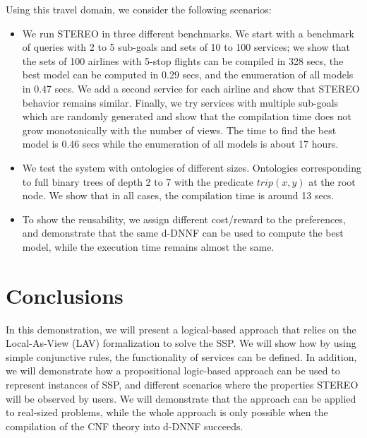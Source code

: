\documentclass{llncs}
\newcommand{\trip}{\textit{trip}}
\begin{document}
Using this travel domain, we  consider the following scenarios:
\begin{itemize}
\item We run STEREO in three different benchmarks.   We start with a benchmark of  queries with 2
to 5 sub-goals and sets of 10 to 100 services; we show that the sets of 100
airlines with 5-stop flights can be compiled in 328 secs, 
the best model can be computed in 0.29 secs, and the enumeration of all models in 0.47 secs. We add a second  service for each airline and show that STEREO behavior remains similar. Finally, we  try services with multiple sub-goals which are randomly generated and show that the compilation time  does not grow monotonically with the number of views.  The time to find the best model 
is 0.46 secs while the enumeration of all models is about 17 hours.
\item We test the system with ontologies of different sizes. Ontologies corresponding to full binary trees of depth 2 to 7  with the predicate $\trip(x,y)$ at the root node. We show that in all cases, the compilation time  is  around 13 secs.
\item To show the reusability, we assign different cost/reward to the  preferences,  
 and demonstrate that the same d-DNNF can be used to compute the best model, while the execution time remains almost the same. 
\end{itemize}

\section{Conclusions}
In this demonstration, we will present a logical-based approach that relies on the Local-As-View (LAV) formalization \cite{levy:bucket} to solve the SSP. We will show how by using simple conjunctive rules, the functionality of services  can be defined. In addition, we will demonstrate how a propositional logic-based approach can be used to represent instances of SSP, and different scenarios where the properties STEREO will be observed by  users.  We will demonstrate that the approach can be applied to
real-sized problems, while the whole approach is only possible
when the compilation of the CNF theory into d-DNNF  succeeds.


 
\end{document}
